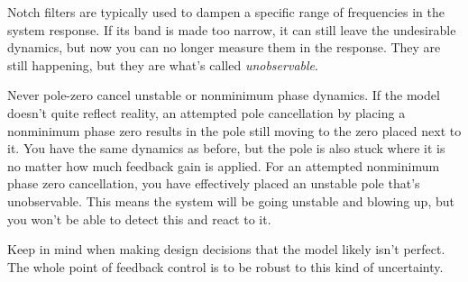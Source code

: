 Notch filters are typically used to dampen a specific range of frequencies in
the \gls{system response}. If its band is made too narrow, it can still leave the
undesirable dynamics, but now you can no longer measure them in the response.
They are still happening, but they are what's called \textit{unobservable}.

Never pole-zero cancel unstable or nonminimum phase dynamics. If the \gls{model}
doesn't quite reflect reality, an attempted pole cancellation by placing a
nonminimum phase zero results in the pole still moving to the zero placed next
to it. You have the same dynamics as before, but the pole is also stuck where it
is no matter how much \gls{feedback gain} is applied. For an attempted
nonminimum phase zero cancellation, you have effectively placed an unstable pole
that's unobservable. This means the \gls{system} will be going unstable and
blowing up, but you won't be able to detect this and react to it.

Keep in mind when making design decisions that the \gls{model} likely isn't
perfect. The whole point of feedback control is to be robust to this kind of
uncertainty.

